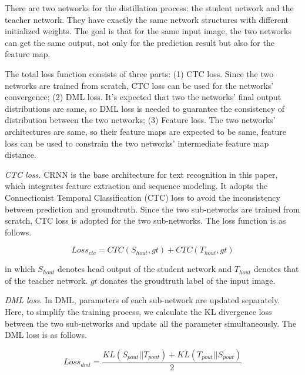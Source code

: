 \documentclass[letterpaper]{article} %
\begin{document}
There are two networks for the distillation process: the student network and the teacher network. They have exactly the same network structures with different initialized weights. The goal is that for the same input image, the two networks can get the same output, not only for the prediction result but also for the feature map.

The total loss function consists of three parts: (1) CTC loss. Since the two networks are trained from scratch, CTC loss can be used for the networks' convergence; (2) DML loss. It's expected that two the networks' final output distributions are same, so DML loss is needed to guarantee the consistency of distribution between the two networks; (3) Feature loss. The two networks' architectures are same, so their feature maps are expected to be same, feature loss can be used to constrain the two networks' intermediate feature map distance.

\textit{CTC loss.}
CRNN is the base architecture for text recognition in this paper, which integrates feature extraction and sequence modeling. It adopts the Connectionist Temporal Classification (CTC) loss \cite{graves2006connectionist} to avoid the inconsistency between prediction and groundtruth. Since the two sub-networks are trained from scratch, CTC loss is adopted for the two sub-networks. The loss function is as follows.

\begin{small}
\begin{equation}
Loss_{ctc} = CTC(S_{hout}, gt) + CTC(T_{hout}, gt)
\end{equation}
\label{loss_ctc}
\end{small}

in which $S_{hout}$ denotes head output of the student network and $T_{hout}$ denotes that of the teacher network. $gt$ donates the groudtruth label of the input image.

\textit{DML loss.}
In DML, parameters of each sub-network are updated separately. Here, to simplify the training process, we calculate the KL divergence loss between the two sub-networks and update all the parameter simultaneously. The DML loss is as follows.


\begin{small}
\begin{equation}
Loss_{dml} = \frac{KL(S_{pout} || T_{pout}) + KL(T_{pout} || S_{pout})}{2}
\end{equation}
\label{loss_dml}
\end{small}
\end{document}
